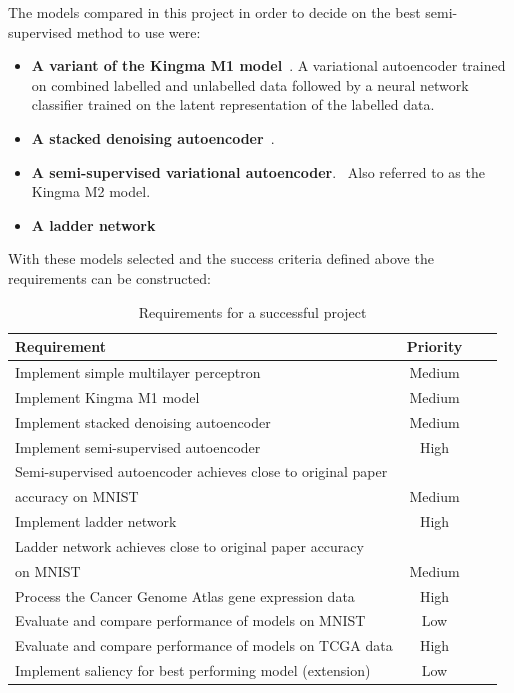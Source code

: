 \documentclass[12pt,a4paper,twoside,openright]{report}
\begin{document}
The models compared in this project in order to decide on the best semi-supervised method to use were:

\begin{itemize}
  \item \textbf{A variant of the Kingma M1 model}~\cite{DBLP:journals/corr/KingmaRMW14}. A variational autoencoder trained on combined 
        labelled and unlabelled data followed by a neural network classifier trained on the latent representation of the labelled data.
  \item \textbf{A stacked denoising autoencoder}~\cite{Vincent:2010:SDA:1756006.1953039}.
  \item \textbf{A semi-supervised variational autoencoder}.~\cite{DBLP:journals/corr/KingmaRMW14} Also referred to as the Kingma M2 model.
  \item \textbf{A ladder network}~\cite{DBLP:journals/corr/RasmusVHBR15}
\end{itemize}

With these models selected and the success criteria defined above the requirements can be constructed:

\begin{table}[H]
  \label{tab:requirements}
  \small %
  \centering %
  \begin{tabular}{lccr} %
  \toprule[\heavyrulewidth]\toprule[\heavyrulewidth]
  \textbf{Requirement} & \textbf{Priority} \\ 
  \midrule
  Implement simple multilayer perceptron & Medium \\
  Implement Kingma M1 model & Medium \\
  Implement stacked denoising autoencoder & Medium \\
  Implement semi-supervised autoencoder & High \\
  Semi-supervised autoencoder achieves close to original paper \\ accuracy on MNIST & Medium \\
  Implement ladder network & High \\
  Ladder network achieves close to original paper accuracy \\ on MNIST & Medium \\
  Process the Cancer Genome Atlas gene expression data & High \\
  Evaluate and compare performance of models on MNIST & Low \\
  Evaluate and compare performance of models on TCGA data & High \\
  Implement saliency for best performing model (extension) & Low \\
  \bottomrule[\heavyrulewidth] 
  \end{tabular}
  \caption{Requirements for a successful project} 
\end{table}
\end{document}
